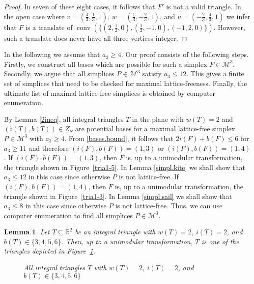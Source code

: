 \documentclass[a4paper]{article}
\theoremstyle{plain}
\newtheorem{lemma}[nn]{Lemma}
\begin{document}
\begin{proof}
In seven of these eight cases, it follows that $F'$ is not a
valid triangle.
In the open case where $v = (\frac{4}{3},\frac{1}{3},1)$, $w
= (\frac{1}{3},-\frac{2}{3},1)$, and $ u =
(-\frac{2}{3},\frac{4}{3},1)$ we infer that $F$ is a
translate of ${{\mathop{\mathrm{{conv}}}}}(\{(2,\frac{1}{2},0), (\frac{1}{2},-1,0),
(-1,2,0)\})$.
However, such a translate does never have all three vertices
integer.
\end{proof}

In the following we assume that $a_3 \geq 4$.
Our proof consists of the following steps.
Firstly, we construct all bases which are possible for such
a simplex $P \in {\mathcal{M}^3}$.
Secondly, we argue that all simplices $P \in {\mathcal{M}^3}$ satisfy
$a_3 \leq 12$.
This gives a finite set of simplices that need to be checked
for maximal lattice-freeness.
Finally, the ultimate list of maximal lattice-free simplices
is obtained by computer enumeration.

By Lemma \ref{2ineq}, all integral triangles $T$ in the
plane with $w(T) = 2$ and $(i(T),b(T)) \in Z_S$ are
potential bases for a maximal lattice-free simplex $P \in
{\mathcal{M}^3}$ with $a_3 \ge 4$.
From \eqref{bases.bound}, it follows that $2 i(F) + b(F)
\leq 6$ for $a_3 \geq 11$ and therefore $(i(F),b(F)) =
(1,3)$ or $(i(F),b(F)) = (1,4)$.
If $(i(F),b(F)) = (1,3)$, then $F$ is, up to a unimodular
transformation, the triangle shown in Figure~\ref{tria1-5}.
In Lemma \ref{simpl.kite} we shall show that $a_3 \leq 12$
in this case since otherwise $P$ is not lattice-free.
If $(i(F),b(F)) = (1,4)$, then $F$ is, up to a unimodular
transformation, the triangle shown in Figure~\ref{tria1-3}.
In Lemma \ref{simpl.sail} we shall show that $a_3 \leq 8$ in
this case since otherwise $P$ is not lattice-free.
Thus, we can use computer enumeration to find all simplices
$P \in {\mathcal{M}^3}$.

\begin{lemma} \label{triangles.i=2,i=3}
Let $T \subseteq {\mathbb{R}}^2$ be an integral triangle with $w(T) =
2$, $i(T) = 2$, and $b(T) \in \{3,4,5,6\}$.
Then, up to a unimodular transformation, $T$ is one of the
triangles depicted in Figure~\ref{triangles.i=2}.
\begin{figure}[ht]
  \centering
  \qquad
  \qquad
  \caption{All integral triangles $T$ with $w(T) = 2$, $i(T)
    = 2$, and $b(T) \in \{3,4,5,6\}$}
  \label{triangles.i=2}
\end{figure}

\end{lemma}
\end{document}

